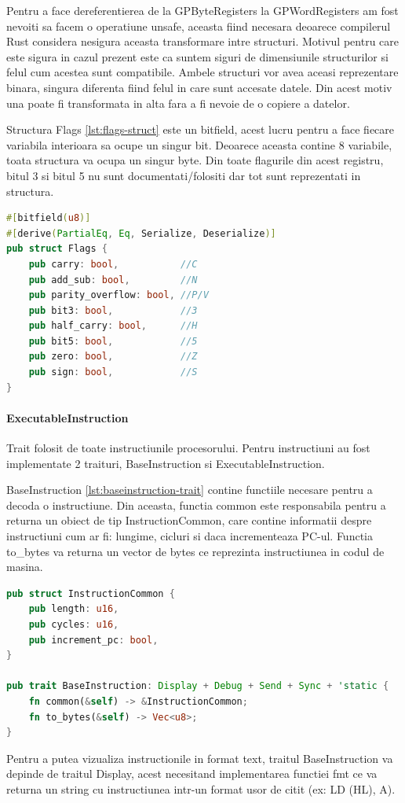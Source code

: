 \documentclass[titlepage,12pt]{article}
\DeclareRobustCommand{\code}[1]{{\ttfamily\small #1}}
\begin{document}
Pentru a face dereferentierea de la \code{GPByteRegisters} la \code{GPWordRegisters} am fost nevoiti sa facem o operatiune unsafe, aceasta fiind necesara deoarece compilerul Rust considera nesigura aceasta transformare intre structuri. Motivul pentru care este sigura in cazul prezent este ca suntem siguri de dimensiunile structurilor si felul cum acestea sunt compatibile.
Ambele structuri vor avea aceasi reprezentare binara, singura diferenta fiind felul in care sunt accesate datele. Din acest motiv una poate fi transformata in alta fara a fi nevoie de o copiere a datelor.

Structura \code{Flags} \cref{lst:flags-struct} este un bitfield, acest lucru pentru a face fiecare variabila interioara sa ocupe un singur bit. Deoarece aceasta contine 8 variabile, toata structura va ocupa un singur byte. Din toate flagurile din acest registru, bitul 3 si bitul 5 nu sunt documentati/folositi dar tot sunt reprezentati in structura.

\begin{lstlisting}[language=Rust,caption={Structura Flags},label={lst:flags-struct}]
#[bitfield(u8)]
#[derive(PartialEq, Eq, Serialize, Deserialize)]
pub struct Flags {
    pub carry: bool,           //C
    pub add_sub: bool,         //N
    pub parity_overflow: bool, //P/V
    pub bit3: bool,            //3
    pub half_carry: bool,      //H
    pub bit5: bool,            //5
    pub zero: bool,            //Z
    pub sign: bool,            //S
}
\end{lstlisting}

\paragraph{\code{ExecutableInstruction}} Trait folosit de toate instructiunile procesorului.
Pentru instructiuni au fost implementate 2 traituri, \code{BaseInstruction} si \code{ExecutableInstruction}.

\code{BaseInstruction} \cref{lst:baseinstruction-trait} contine functiile necesare pentru a decoda o instructiune. Din aceasta, functia common este responsabila pentru a returna un obiect de tip \code{InstructionCommon}, care contine informatii despre instructiuni cum ar fi: lungime, cicluri si daca incrementeaza PC-ul. Functia \code{to\_bytes} va returna un vector de bytes ce reprezinta instructiunea in codul de masina.

\begin{lstlisting}[language=Rust,caption={Trait BaseInstruction},label={lst:baseinstruction-trait}]
pub struct InstructionCommon {
    pub length: u16,
    pub cycles: u16,
    pub increment_pc: bool,
}

pub trait BaseInstruction: Display + Debug + Send + Sync + 'static {
    fn common(&self) -> &InstructionCommon;
    fn to_bytes(&self) -> Vec<u8>;
}
\end{lstlisting}
Pentru a putea vizualiza instructionile in format text, traitul \code{BaseInstruction} va depinde de traitul \code{Display}, acest necesitand implementarea functiei \code{fmt} ce va returna un string cu instructiunea intr-un format usor de citit (ex: \code{LD (HL), A}).
\end{document}
